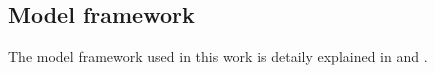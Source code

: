 \subsection{Model framework }
	The model framework used in this work is detaily explained in  and .
		
